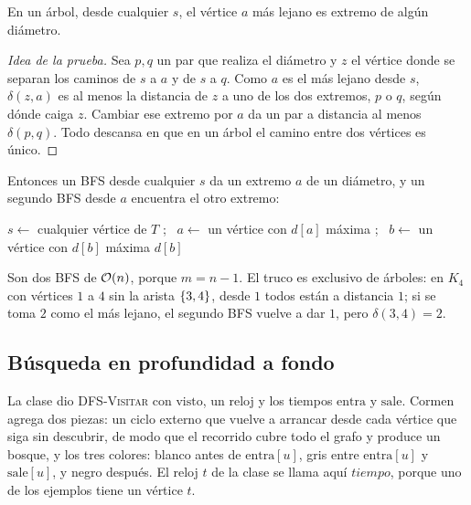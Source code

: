 \documentclass[11pt,letterpaper]{article}
\begin{document}
\begin{proposicion}
  \label{prop:busq-diametro}
  En un árbol, desde cualquier $s$, el vértice $a$ más lejano es
  extremo de algún diámetro.
\end{proposicion}

\begin{proof}[Idea de la prueba]
  Sea $p, q$ un par que realiza el diámetro y $z$ el vértice donde se
  separan los caminos de $s$ a $a$ y de $s$ a $q$. Como $a$ es el más
  lejano desde $s$, $\delta(z, a)$ es al menos la distancia de $z$ a
  uno de los dos extremos, $p$ o $q$, según dónde caiga $z$. Cambiar
  ese extremo por $a$ da un par a distancia al menos $\delta(p, q)$.
  Todo descansa en que en un árbol el camino entre dos vértices es
  único.
\end{proof}

Entonces un BFS desde cualquier $s$ da un extremo $a$ de un diámetro,
y un segundo BFS desde $a$ encuentra el otro extremo:

\begin{algorithm}[H]
\caption{\textsc{Diámetro}$(T)$ de un árbol con dos BFS}
\label{alg:busq-diametro}
\begin{algorithmic}[1]
  \State $s \gets$ cualquier vértice de $T$
  \State {}; \ $a \gets$ un vértice con $d[a]$ máxima
  \State {}; \ $b \gets$ un vértice con $d[b]$ máxima
  \State \Return $d[b]$
\EndProcedure
\end{algorithmic}
\end{algorithm}

Son dos BFS de $\mathcal{O}\!\left(n\right)$, porque $m = n - 1$. El truco es exclusivo
de árboles: en $K_4$ con vértices $1$ a $4$ sin la arista
$\left\{ 3, 4 \right\}$, desde $1$ todos están a distancia $1$; si se toma $2$
como el más lejano, el segundo BFS vuelve a dar $1$, pero
$\delta(3, 4) = 2$.


\subsection*{Búsqueda en profundidad a fondo}

La clase dio \textsc{DFS-Visitar} con $\text{visto}$, un reloj y los
tiempos $\text{entra}$ y $\text{sale}$. Cormen agrega dos piezas: un
ciclo externo que vuelve a arrancar desde cada vértice que siga sin
descubrir, de modo que el recorrido cubre todo el grafo y produce un
bosque, y los tres colores: blanco antes de $\text{entra}[u]$, gris
entre $\text{entra}[u]$ y $\text{sale}[u]$, y negro después. El reloj
$t$ de la clase se llama aquí $\mathit{tiempo}$, porque uno de los
ejemplos tiene un vértice $t$.
\end{document}
